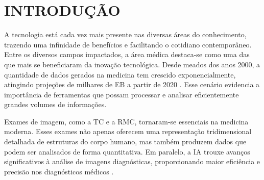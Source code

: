 \chapter{INTRODUÇÃO}
\label{chap:intro}

A tecnologia está cada vez mais presente nas diversas áreas do conhecimento, trazendo uma infinidade de benefícios e facilitando o cotidiano contemporâneo. Entre os diversos campos impactados, a área médica destaca-se como uma das que mais se beneficiaram da inovação tecnológica. Desde meados dos anos 2000, a quantidade de dados gerados na medicina tem crescido exponencialmente, atingindo projeções de milhares de \gls{EB} a partir de 2020 \cite{gantzDIGITALUNIVERSE2020}. Esse cenário evidencia a importância de ferramentas que possam processar e analisar eficientemente grandes volumes de informações.


Exames de imagem, como a \gls{TC} e a \gls{RMC}, tornaram-se essenciais na medicina moderna. Esses exames não apenas oferecem uma representação tridimensional detalhada de estruturas do corpo humano, mas também produzem dados que podem ser analisados de forma quantitativa. Em paralelo, a \gls{IA} trouxe avanços significativos à análise de imagens diagnósticas, proporcionando maior eficiência e precisão nos diagnósticos médicos \cite{argentieroApplicationsArtificialIntelligence2022}.



